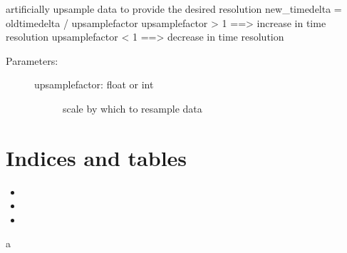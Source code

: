 \documentclass[letterpaper,10pt,english]{sphinxmanual}
\begin{document}
\begin{fulllineitems}
\label{\detokenize{code:ATom.atom_functions.upsample_data_deptricated}}
artificially upsample data to provide the desired resolution
new\_timedelta = oldtimedelta / upsamplefactor
upsamplefactor \textgreater{} 1 ==\textgreater{} increase in time resolution
upsamplefactor \textless{} 1 ==\textgreater{} decrease in time resolution
\begin{description}
\item[{Parameters:}] \leavevmode\begin{description}
\item[{upsamplefactor: float or int}] \leavevmode
scale by which to resample data

\end{description}

\end{description}

\end{fulllineitems}



\chapter{Indices and tables}
\label{\detokenize{index:indices-and-tables}}\begin{itemize}
\item {} 

\item {} 

\item {} 

\end{itemize}


\renewcommand{\indexname}{Python Module Index}
\begin{sphinxtheindex}
\def\bigletter#1{{\Large\sffamily#1}\nopagebreak\vspace{1mm}}
\bigletter{a}
\item {}
\end{sphinxtheindex}

\renewcommand{\indexname}{Index}
\printindex
\end{document}

